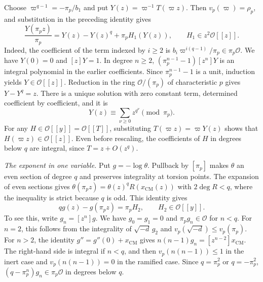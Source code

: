 Choose \(\varpi^{q-1}=-\pi_p/b_1\) and put \(Y(z)=\varpi^{-1}T(\varpi z)\).
Then \(v_p(\varpi)=\rho_p\), and substitution in the preceding identity gives
\[
 \frac{Y(\pi_p z)}{\pi_p}=Y(z)-Y(z)^q+\pi_p H_1(Y(z)),
 \qquad H_1\in z^2\mathcal O[[z]].
\]
Indeed, the coefficient of the term indexed by \(i\ge2\) is
\(b_i\varpi^{i(q-1)}/\pi_p\in\pi_p\mathcal O\).
We have \(Y(0)=0\) and \([z]Y=1\). In degree \(n\ge2\),
\((\pi_p^{n-1}-1)[z^n]Y\) is an integral polynomial in the earlier
coefficients. Since \(\pi_p^{n-1}-1\) is a unit, induction yields
\(Y\in\mathcal O[[z]]\). Reduction in the ring \(\mathcal O/(\pi_p)\) of
characteristic \(p\) gives \(Y-Y^q=z\). There is a unique solution with
zero constant term, determined coefficient by coefficient, and it is
\begin{equation}\label{eq:upper-formalparam}
 Y(z)\equiv\sum_{\nu\ge0}z^{q^\nu}\pmod{\pi_p}.
\end{equation}
For any \(H\in\mathcal O[[y]]=\mathcal O[[T]]\), substituting
\(T(\varpi z)=\varpi Y(z)\) shows that \(H(\varpi z)\in\mathcal O[[z]]\).
Even before rescaling, the coefficients of \(H\) in degrees below \(q\)
are integral, since \(T=z+O(z^q)\).

\emph{The exponent in one variable.}
Put \(g=-\log\theta\). Pullback by \([\pi_p]\) makes \(\theta\) an even
section of degree \(q\) and preserves integrality at torsion points.
The expansion of even sections gives
\(\theta(\pi_p z)=\theta(z)^qR(x_\mathrm{CM}(z))\) with \(2\deg R<q\),
where the inequality is strict because \(q\) is odd.
This identity gives
\begin{equation}\label{eq:upper-frobenius}
 q g(z)-g(\pi_p z)=\pi_p H_2,\qquad H_2\in\mathcal O[[y]].
\end{equation}
To see this, write \(g_n=[z^n]g\). We have \(g_0=g_1=0\) and
\(\pi_p g_n\in\mathcal O\) for \(n<q\).
For \(n=2\), this follows from the integrality of \(\sqrt{-d}\,g_2\)
and \(v_p(\sqrt{-d})\le v_p(\pi_p)\).
For \(n>2\), the identity \(g''=g''(0)+x_\mathrm{CM}\) gives
\(n(n-1)g_n=[z^{n-2}]x_\mathrm{CM}\). The right-hand side is integral
if \(n<q\), and then \(v_p(n(n-1))\le1\) in the inert case and
\(v_p(n(n-1))=0\) in the ramified case.
Since \(q=\pi_p^2\) or \(q=-\pi_p^2\),
\((q-\pi_p^n)g_n\in\pi_p\mathcal O\) in degrees below \(q\).

